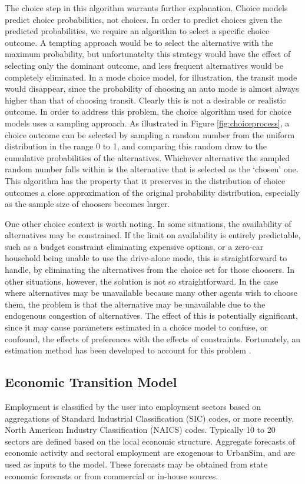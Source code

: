 The choice step in this algorithm warrants further explanation.  Choice models predict choice probabilities, not choices.
In order to predict choices given the predicted probabilities, we require an algorithm to select a specific choice outcome.
A tempting approach would be to select the alternative with the maximum probability, but unfortunatelty this strategy
would have the effect of selecting only the dominant outcome, and less frequent alternatives would be completely
eliminated.  In a mode choice model, for illustration, the transit mode would disappear, since the probability of choosing
an auto mode is almost always higher than that of choosing transit.  Clearly this is not a desirable or realistic outcome.
In order to address this problem, the choice algorithm used for choice models uses a sampling approach.  As illustrated in Figure
\ref{fig:choiceprocess}, a choice outcome can be selected by sampling a random number from the uniform distribution in the range
0 to 1, and comparing this random draw to the cumulative probabilities of the alternatives.  Whichever alternative the sampled
random number falls within is the alternative that is selected as the `chosen' one.  This algorithm has the property that it
preserves in the distribution of choice outcomes a close approximation of the original probability distribution, especially
as the sample size of choosers becomes larger.

One other choice context is worth noting.  In some situations, the availability of alternatives may be constrained.  If the limit on availability
is entirely predictable, such as a budget constraint eliminating expensive options, or a zero-car household being unable to use the drive-alone
mode, this is straightforward to handle, by eliminating the alternatives from the choice set for those choosers.  In other situations, however, the
solution is not so straightforward.  In the case where alternatives may be unavailable because many other agents wish to choose them, the problem
is that the alternative may be unavailable due to the endogenous congestion of alternatives.  The effect of this is potentially significant, since it
may cause parameters estimated in a choice model to confuse, or confound, the effects of preferences with the effects of constraints.  Fortunately,
an estimation method has been developed to account for this problem \cite{depalma-jue-2007}.

\subsection{Economic Transition Model}
Employment is classified by the user into employment sectors based
on aggregations of Standard Industrial Classification (SIC) codes, or more
recently, North American Industry Classification (NAICS) codes.
Typically 10 to 20 sectors are defined based on the local economic
structure. Aggregate forecasts of economic activity and sectoral
employment are exogenous to UrbanSim, and are used as inputs to
the model. These forecasts may be obtained from state economic
forecasts or from commercial or in-house sources.

